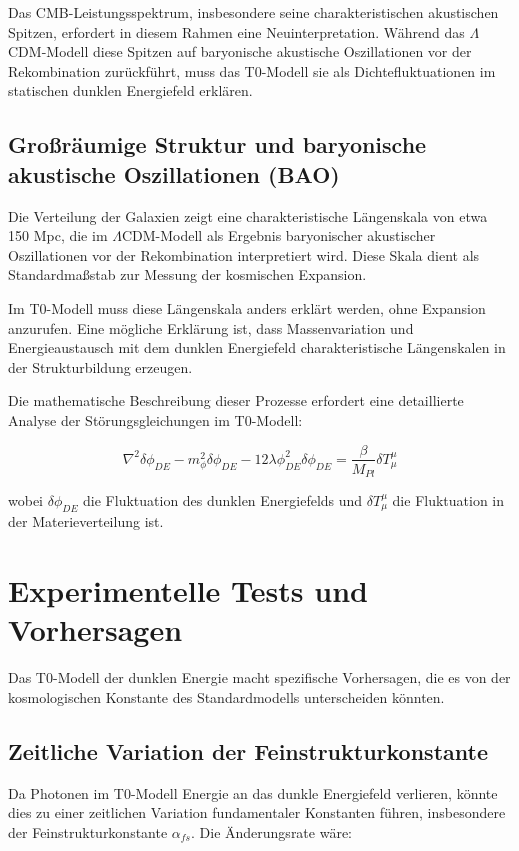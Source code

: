 \documentclass[a4paper,12pt]{article}
\theoremstyle{definition}
\theoremstyle{remark}
\begin{document}
	Das CMB-Leistungsspektrum, insbesondere seine charakteristischen akustischen Spitzen, erfordert in diesem Rahmen eine Neuinterpretation. Während das $\Lambda$CDM-Modell diese Spitzen auf baryonische akustische Oszillationen vor der Rekombination zurückführt, muss das T0-Modell sie als Dichtefluktuationen im statischen dunklen Energiefeld erklären.
	
	\subsection{Großräumige Struktur und baryonische akustische Oszillationen (BAO)}
	Die Verteilung der Galaxien zeigt eine charakteristische Längenskala von etwa 150 Mpc, die im $\Lambda$CDM-Modell als Ergebnis baryonischer akustischer Oszillationen vor der Rekombination interpretiert wird. Diese Skala dient als Standardmaßstab zur Messung der kosmischen Expansion.
	
	Im T0-Modell muss diese Längenskala anders erklärt werden, ohne Expansion anzurufen. Eine mögliche Erklärung ist, dass Massenvariation und Energieaustausch mit dem dunklen Energiefeld charakteristische Längenskalen in der Strukturbildung erzeugen.
	
	Die mathematische Beschreibung dieser Prozesse erfordert eine detaillierte Analyse der Störungsgleichungen im T0-Modell:
	
	\begin{equation}
		\nabla^2 \delta\phi_{DE} - m_{\phi}^2 \delta\phi_{DE} - 12\lambda\phi_{DE}^2 \delta\phi_{DE} = \frac{\beta}{M_{Pl}}\delta T^{\mu}_{\mu}
	\end{equation}
	
	wobei $\delta\phi_{DE}$ die Fluktuation des dunklen Energiefelds und $\delta T^{\mu}_{\mu}$ die Fluktuation in der Materieverteilung ist.
	
	\section{Experimentelle Tests und Vorhersagen}
	Das T0-Modell der dunklen Energie macht spezifische Vorhersagen, die es von der kosmologischen Konstante des Standardmodells unterscheiden könnten.
	
	\subsection{Zeitliche Variation der Feinstrukturkonstante}
	Da Photonen im T0-Modell Energie an das dunkle Energiefeld verlieren, könnte dies zu einer zeitlichen Variation fundamentaler Konstanten führen, insbesondere der Feinstrukturkonstante $\alpha_{fs}$. Die Änderungsrate wäre:
	
\end{document}
